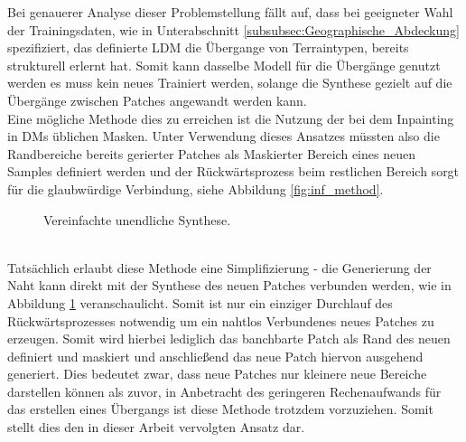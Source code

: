Bei genauerer Analyse dieser Problemstellung fällt auf, dass bei geeigneter Wahl der Trainingsdaten, wie in Unterabschnitt \ref{subsubsec:Geographische_Abdeckung} spezifiziert, das definierte \ac{LDM} die Übergange von Terraintypen, bereits strukturell erlernt hat. Somit kann dasselbe Modell für die Übergänge genutzt werden es muss kein neues Trainiert werden, solange die Synthese gezielt auf die Übergänge zwischen Patches angewandt werden kann. \\
Eine mögliche Methode dies zu erreichen ist die Nutzung der bei dem Inpainting in \ac{DM}s üblichen Masken. Unter Verwendung dieses Ansatzes müssten also die Randbereiche bereits gerierter Patches als Maskierter Bereich eines neuen Samples definiert werden und der Rückwärtsprozess beim restlichen Bereich sorgt für die glaubwürdige Verbindung, siehe Abbildung \ref{fig:inf_method}.
\begin{figure}[htbp]
    \centering
    \caption{Vereinfachte unendliche Synthese.}
    \label{fig:inf_smart}
\end{figure} \\
Tatsächlich erlaubt diese Methode eine Simplifizierung - die Generierung der Naht kann direkt mit der Synthese des neuen Patches verbunden werden, wie in Abbildung \ref{fig:inf_smart} veranschaulicht. Somit ist nur ein einziger Durchlauf des Rückwärtsprozesses notwendig um ein nahtlos Verbundenes neues Patches zu erzeugen. Somit wird hierbei lediglich das banchbarte Patch als Rand des neuen definiert und maskiert und anschließend das neue Patch hiervon ausgehend generiert. Dies bedeutet zwar, dass neue Patches nur kleinere neue Bereiche darstellen können als zuvor, in Anbetracht des geringeren Rechenaufwands für das erstellen eines Übergangs ist diese Methode trotzdem vorzuziehen. Somit stellt dies den in dieser Arbeit vervolgten Ansatz dar.

